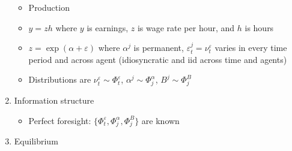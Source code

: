 \documentclass{article}
\begin{document}
\begin{enumerate}
\begin{itemize}
\item Production
\item $y = zh$ where $y$ is earnings, $z$ is wage rate per hour, and $h$ is hours
\item $z = \exp(\alpha + \varepsilon)$ where $\alpha^j$ is permanent, $\varepsilon_t^j = \nu_t^\varepsilon$ varies in every time period and across agent (idiosyncratic and iid across time and agents)
\item Distributions are $\nu_t^\varepsilon \sim \Phi_t^\varepsilon$, $\alpha^j \sim \Phi_j^\alpha$, $B^j \sim \Phi_j^B$ 
\end{itemize}

\item Information structure

\begin{itemize}
\item Perfect foresight: $\{ \Phi_t^\varepsilon, \Phi_j^\alpha, \Phi_j^B \}$ are known
\end{itemize}


\item Equilibrium


\end{enumerate}
\end{document}
